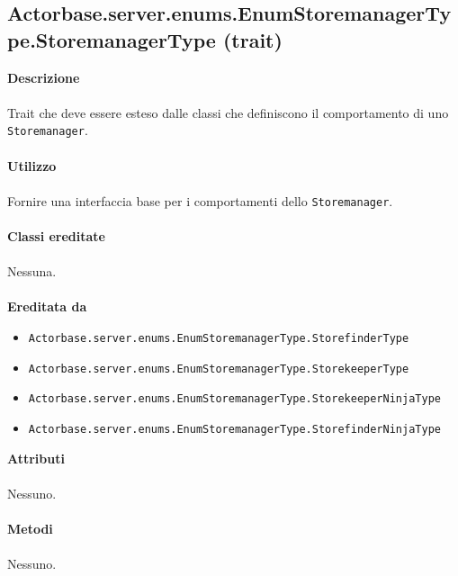 \documentclass[a4paper]{article}
\begin{document}
			
				\subsection{Actorbase.server.enums.EnumStoremanagerType.StoremanagerType (trait)}
		\textbf{Descrizione}
			\\ \\
			Trait che deve essere esteso dalle classi che definiscono il comportamento di uno \texttt{Storemanager}.
			\\ \\
		\textbf{Utilizzo}
			\\ \\
			Fornire una interfaccia base per i comportamenti dello \texttt{Storemanager}.
			\\ \\
		\textbf{Classi ereditate}
		\\ \\
		Nessuna.
		\\ \\
		\textbf{Ereditata da}
			\begin{itemize}
				\item \texttt{Actorbase.server.enums.EnumStoremanagerType.StorefinderType}
				\item \texttt{Actorbase.server.enums.EnumStoremanagerType.StorekeeperType}
				\item \texttt{Actorbase.server.enums.EnumStoremanagerType.StorekeeperNinjaType}
				\item \texttt{Actorbase.server.enums.EnumStoremanagerType.StorefinderNinjaType}
			\end{itemize}
		\textbf{Attributi}
		\\ \\
			Nessuno.
			\\ \\
		\textbf{Metodi}
			\\ \\
			Nessuno.
			
\end{document}
